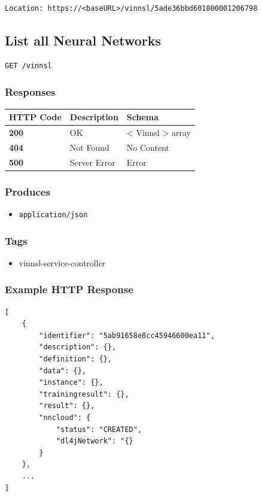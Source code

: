 \begin{verbatim}
Location: https://<baseURL>/vinnsl/5ade36bbd601800001206798
\end{verbatim}

\subsection{List all Neural Networks}\label{list-all-neural-networks}

\begin{verbatim}
GET /vinnsl
\end{verbatim}

\subsubsection{Responses}\label{responses-1}

\begin{longtable}[]{@{}lll@{}}
\toprule
HTTP Code & Description & Schema\tabularnewline
\midrule
\endhead
\textbf{200} & OK & \textless{} Vinnsl \textgreater{}
array\tabularnewline
\textbf{404} & Not Found & No Content\tabularnewline
\textbf{500} & Server Error & Error\tabularnewline
\bottomrule
\end{longtable}

\subsubsection{Produces}\label{produces-1}

\begin{itemize}
\tightlist
\item
  \texttt{application/json}
\end{itemize}

\subsubsection{Tags}\label{tags-1}

\begin{itemize}
\tightlist
\item
  vinnsl-service-controller
\end{itemize}

\subsubsection{Example HTTP Response}\label{example-http-response-1}

\begin{verbatim}
[
    {
        "identifier": "5ab91658e8cc45946600ea11",
        "description": {},
        "definition": {},
        "data": {},
        "instance": {},
        "trainingresult": {},
        "result": {},
        "nncloud": {
            "status": "CREATED",
            "dl4jNetwork": "{}
        }
    },
    ...
]
\end{verbatim}

